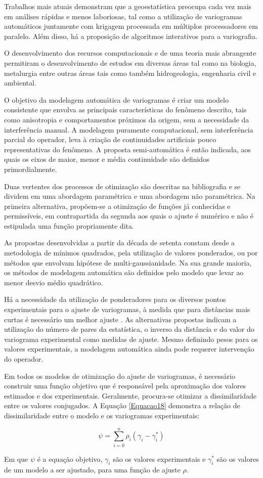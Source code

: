 Trabalhos mais atuais demonstram que a geoestatística preocupa cada vez mais em análises rápidas e menos laboriosas, tal como a utilização de variogramas automáticos juntamente com krigagem processada em múltiplos processadores em paralelo. Além disso, há a proposição de algoritmos interativos para a variografia. 

O desenvolvimento dos recursos computacionais e de uma teoria mais abrangente  permitiram o desenvolvimento de estudos em diversas áreas tal como na biologia, metalurgia entre outras áreas tais como também hidrogeologia, engenharia civil e ambiental. 

O objetivo da modelagem automática de variogramas é criar um modelo consistente que envolva as principais características do fenômeno descrito, tais como anisotropia e comportamentos próximos da origem, sem a necessidade da interferência manual. A modelagem puramente computacional, sem interferência parcial do operador, leva à criação de continuidades artificiais pouco representativas do fenômeno. A proposta semi-automática é então indicada, aos quais os eixos de maior, menor e média continuidade são definidos primordialmente. 

Duas vertentes dos processos de otimização são descritas na bibliografia e se dividem em uma abordagem paramétrica e uma abordagem não paramétrica. Na primeira alternativa, propõem-se a otimização de funções já conhecidas e permissíveis, em contrapartida da segunda aos quais o ajuste é numérico e não é estipulada uma função propriamente dita. 

As propostas desenvolvidas a partir da década de setenta constam desde a metodologia de mínimos quadrados, pela utilização de valores ponderados, ou por métodos que envolvam hipótese de multi-gaussianidade.  
Na sua grande maioria, os métodos de modelagem automática são definidos pelo modelo que levar ao menor desvio médio quadrático. 

Há a necessidade da utilização de ponderadores para os diversos pontos experimentais para o ajuste de variogramas, à medida que para distâncias mais curtas é necessário um melhor ajuste . As alternativas propostas indicam a utilização do número de pares da estatística, o inverso da distância e do valor do variograma experimental como medidas de ajuste. Mesmo definindo pesos para os valores experimentais, a modelagem automática ainda pode requerer intervenção do operador. 

Em todos os modelos de otimização do ajuste de variogramas, é necessário construir uma função objetivo que é responsável pela aproximação dos valores estimados e dos experimentais. Geralmente, procura-se otimizar a dissimilaridade entre os valores conjugados. A Equação \ref{Equacao18} demonstra a relação de dissimilaridade entre o modelo e os variogramas experimentais:

\begin{equation}\label{Equacao18}
\psi = \sum_{i=0}^{n}\rho_i(\gamma_i - \gamma_i^*)
\end{equation}

Em que $\psi$ é a equação objetivo, $\gamma_i$ são os valores experimentais e  $\gamma_i^*$ são os valores de um modelo a ser ajustado, para uma função de ajuste $\rho$.

